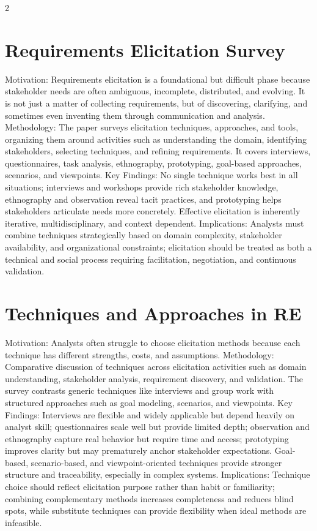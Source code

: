 \documentclass[8pt,a4paper]{extarticle}
\begin{document}
\begin{multicols*}{2}
    \raggedcolumns


    \section{Requirements Elicitation Survey}
    Motivation: Requirements elicitation is a foundational but difficult phase because stakeholder needs are often ambiguous, incomplete, distributed, and evolving. It is not just a matter of collecting requirements, but of discovering, clarifying, and sometimes even inventing them through communication and analysis. Methodology: The paper surveys elicitation techniques, approaches, and tools, organizing them around activities such as understanding the domain, identifying stakeholders, selecting techniques, and refining requirements. It covers interviews, questionnaires, task analysis, ethnography, prototyping, goal-based approaches, scenarios, and viewpoints. Key Findings: No single technique works best in all situations; interviews and workshops provide rich stakeholder knowledge, ethnography and observation reveal tacit practices, and prototyping helps stakeholders articulate needs more concretely. Effective elicitation is inherently iterative, multidisciplinary, and context dependent. Implications: Analysts must combine techniques strategically based on domain complexity, stakeholder availability, and organizational constraints; elicitation should be treated as both a technical and social process requiring facilitation, negotiation, and continuous validation.

    \section{Techniques and Approaches in RE}
    Motivation: Analysts often struggle to choose elicitation methods because each technique has different strengths, costs, and assumptions. Methodology: Comparative discussion of techniques across elicitation activities such as domain understanding, stakeholder analysis, requirement discovery, and validation. The survey contrasts generic techniques like interviews and group work with structured approaches such as goal modeling, scenarios, and viewpoints. Key Findings: Interviews are flexible and widely applicable but depend heavily on analyst skill; questionnaires scale well but provide limited depth; observation and ethnography capture real behavior but require time and access; prototyping improves clarity but may prematurely anchor stakeholder expectations. Goal-based, scenario-based, and viewpoint-oriented techniques provide stronger structure and traceability, especially in complex systems. Implications: Technique choice should reflect elicitation purpose rather than habit or familiarity; combining complementary methods increases completeness and reduces blind spots, while substitute techniques can provide flexibility when ideal methods are infeasible.


\end{multicols*}
\end{document}
